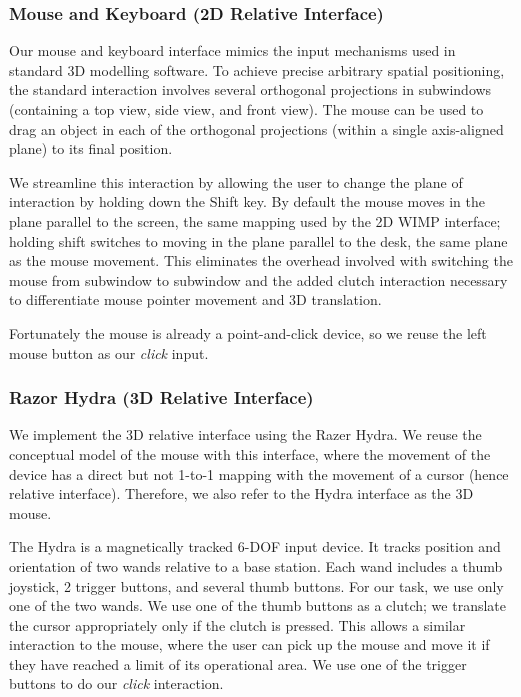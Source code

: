 \subsubsection{Mouse and Keyboard (2D Relative Interface)}
Our mouse and keyboard interface mimics the input mechanisms used in standard 3D
modelling software. To achieve precise arbitrary spatial positioning, the
standard interaction involves several orthogonal projections in subwindows
(containing a top view, side view, and front view). The mouse can be used to
drag an object in each of the orthogonal projections (within a single
axis-aligned plane) to its final position.

We streamline this interaction by allowing the user to change the
plane of interaction by holding down the Shift key. By default the mouse moves
in the plane parallel to the screen, the same mapping used by the 2D WIMP
interface; holding shift switches to moving in the plane parallel to the desk,
the same plane as the mouse movement. This eliminates the overhead involved with
switching the mouse from subwindow to subwindow and the added clutch interaction
\cite{bravenuiworld} necessary to differentiate mouse pointer movement and 3D
translation.

Fortunately the mouse is already a point-and-click device, so we reuse the
left mouse button as our {\it click} input.
\subsubsection{Razor Hydra (3D Relative Interface)}
We implement the 3D relative interface using the Razer Hydra. We reuse the
conceptual model of the mouse with this interface, where the movement of the
device has a direct but not 1-to-1 mapping with the movement of a cursor (hence
relative interface). Therefore, we also refer to the Hydra interface as the 3D
mouse.

The Hydra is a magnetically tracked 6-DOF input device. It tracks position and
orientation of two wands relative to a base station. Each wand includes a thumb
joystick, 2 trigger buttons, and several thumb buttons. For our task, we use
only one of the two wands. We use one of the thumb buttons as a clutch; we
translate the cursor appropriately only if the clutch is pressed. This allows a
similar interaction to the mouse, where the user can pick up the mouse and move
it if they have reached a limit of its operational area. We use one of the
trigger buttons to do our {\it click} interaction.

